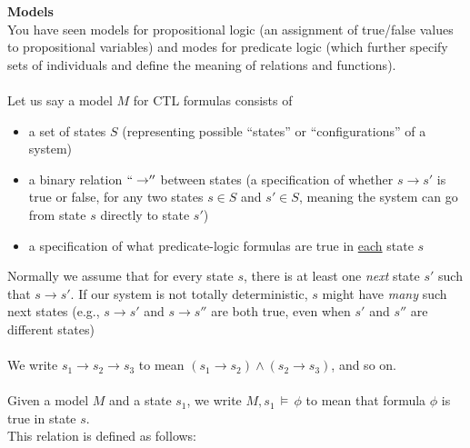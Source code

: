 \documentclass[12pt,letterpaper,boxed,cm]{hmcpset}
\newcommand{\ra}[0]{\rightarrow}
\newcommand{\turn}[0]{\,\vDash\,}
\begin{document}
\textbf{Models}\\
You have seen models for propositional logic (an assignment of true/false values to propositional variables) and modes for predicate logic (which further specify sets of individuals and define the meaning of relations and functions).\\\\
Let us say a model $M$ for CTL formulas consists of
\begin{itemize}
    \item a set of states $S$ (representing possible ``states'' or ``configurations'' of a system)
    \item a binary relation $``\ra''$ between states (a specification of whether $s \ra s'$ is true or false, for any two states $s\in S$ and $s'\in S$, meaning the system can go from state $s$ directly to state $s'$)
    \item a specification of what predicate-logic formulas are true in \ul{each} state $s$
\end{itemize}
Normally we assume that for every state $s$, there is at least one \emph{next} state $s'$ such that $s \ra s'$. If our system is not totally deterministic, $s$ might have \emph{many} such next states (e.g., $s \ra s'$ and $s\ra s''$ are both true, even when $s'$ and $s''$ are different states)\\\\
We write $s_1 \ra s_2 \ra s_3$  to mean $(s_1 \ra s_2) \land (s_2 \ra s_3)$, and so on.\\\\
Given a model $M$ and a state $s_1$, we write $M,s_1 \turn \phi$  to mean that formula $\phi$ is true in state $s$.\\
This relation is defined as follows:
\end{document}
